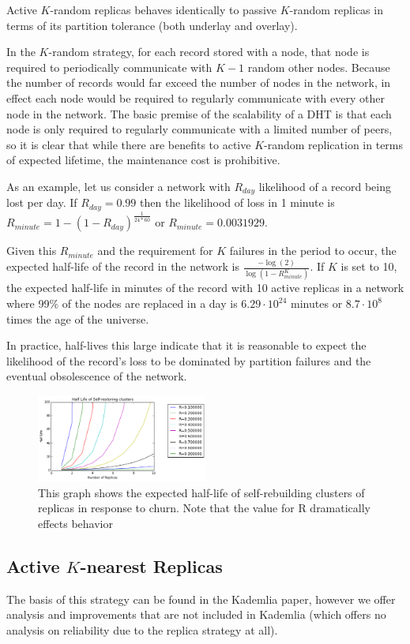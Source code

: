 Active $K$-random replicas behaves identically to passive $K$-random replicas in terms of its partition tolerance (both underlay and overlay).

In the $K$-random strategy, for each record stored with a node, that node is required to periodically communicate with $K-1$ random other nodes.
Because the number of records would far exceed the number of nodes in the network, in effect each node would be required to regularly communicate with every other node in the network.
The basic premise of the scalability of a DHT is that each node is only required to regularly communicate with a limited number of peers, so it is clear that while there are benefits to active $K$-random replication in terms of expected lifetime, the maintenance cost is prohibitive.


As an example, let us consider a network with $R_{day}$ likelihood of a record being lost per day.
If $R_{day}=0.99$ then the likelihood of loss in 1 minute is $R_{minute} = 1-(1-R_{day})^{\frac{1}{24*60}}$ or $R_{minute} = 0.0031929$. 

Given this $R_{minute}$ and the requirement for $K$ failures in the period to occur, the expected half-life of the record in the network is $\frac{-\log(2)}{\log(1-R_{minute}^{K})}$.
If $K$ is set to 10, the expected half-life in minutes of the record with 10 active replicas in a network where 99\% of the nodes are replaced in a day is $6.29  \cdot 10^{24}$ minutes or $8.7 \cdot 10^{8}$ times the age of the universe.

In practice, half-lives this large indicate that it is reasonable to expect the likelihood of the record's loss to  be dominated by partition failures and the eventual obsolescence of the network.

\begin{figure}[h!]
	\includegraphics[width=0.5\textwidth]{figs/self_healing}
	\caption{This graph shows the expected half-life of self-rebuilding clusters of replicas in response to churn. Note that the value for R dramatically effects behavior}
\end{figure}


\subsection{Active $K$-nearest Replicas}
The basis of this strategy can be found in the Kademlia \cite{kademlia} paper, however we offer analysis and improvements that are not included in Kademlia (which offers no analysis on reliability due to the replica strategy at all).

